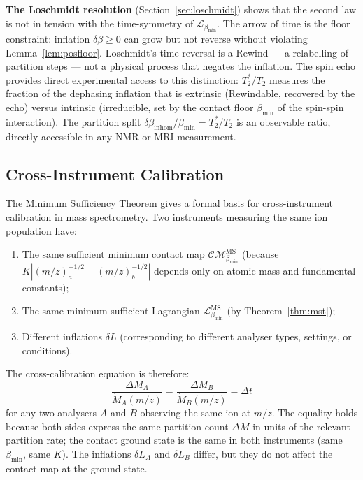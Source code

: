 \documentclass[11pt,twocolumn,a4paper]{article}
\theoremstyle{plain}
\theoremstyle{definition}
\theoremstyle{remark}
\newcommand{\bmin}{\beta_{\min}}
\newcommand{\Lmin}{\mathcal{L}_{\bmin}}
\newcommand{\CM}{\mathcal{CM}}
\begin{document}
\textbf{The Loschmidt resolution} (Section~\ref{sec:loschmidt}) shows that the
second law is not in tension with the time-symmetry of $\Lmin$. The arrow of
time is the floor constraint: inflation $\delta\beta \geq 0$ can grow but not
reverse without violating Lemma~\ref{lem:posfloor}. Loschmidt's time-reversal
is a Rewind --- a relabelling of partition steps --- not a physical process that
negates the inflation. The spin echo provides direct experimental access to this
distinction: $T_2^*/T_2$ measures the fraction of the dephasing inflation that
is extrinsic (Rewindable, recovered by the echo) versus intrinsic (irreducible,
set by the contact floor $\bmin$ of the spin-spin interaction). The partition
split $\delta\beta_{\mathrm{inhom}}/\bmin = T_2^*/T_2$ is an observable ratio,
directly accessible in any NMR or MRI measurement.

\subsection{Cross-Instrument Calibration}

The Minimum Sufficiency Theorem gives a formal basis for cross-instrument
calibration in mass spectrometry. Two instruments measuring the same ion
population have:
\begin{enumerate}[label=(\roman*)]
  \item The same sufficient minimum contact map $\CM_{\bmin}^{\mathrm{MS}}$
  (because $K|(m/z)_a^{-1/2} - (m/z)_b^{-1/2}|$ depends only on atomic
  mass and fundamental constants);
  \item The same minimum sufficient Lagrangian $\Lmin^{\mathrm{MS}}$ (by
  Theorem~\ref{thm:mst});
  \item Different inflations $\delta L$ (corresponding to different analyser
  types, settings, or conditions).
\end{enumerate}
The cross-calibration equation is therefore:
\[
  \frac{\Delta M_A}{\dot{M}_A(m/z)} = \frac{\Delta M_B}{\dot{M}_B(m/z)} = \Delta t
\]
for any two analysers $A$ and $B$ observing the same ion at $m/z$. The equality
holds because both sides express the same partition count $\Delta M$ in units
of the relevant partition rate; the contact ground state is the same in both
instruments (same $\bmin$, same $K$). The inflations $\delta L_A$ and $\delta
L_B$ differ, but they do not affect the contact map at the ground state.
\end{document}
